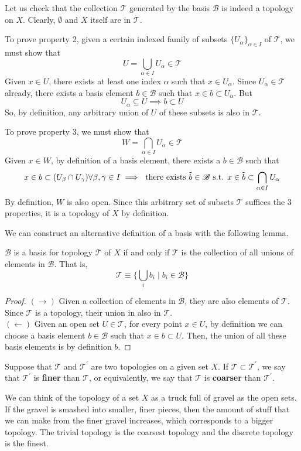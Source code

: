 \documentclass{article}
\begin{document}
    Let us check that the collection $\mathscr{T}$ generated by the basis $\mathscr{B}$ is indeed a topology on $X$. Clearly, $\emptyset$ and $X$ itself are in $\mathscr{T}$. 

    To prove property 2, given a certain indexed family of subsets $\{U_\alpha\}_{\alpha \in I}$ of $\mathscr{T}$, we must show that 
    \[U = \bigcup_{\alpha \in I} U_\alpha \in \mathscr{T}\]
    Given $x \in U$, there exists at least one index $\alpha$ such that $x \in U_\alpha$. Since $U_\alpha \in \mathscr{T}$ already, there exists a basis element $b \in \mathscr{B}$ such that $x \in b \subset U_\alpha$. But 
    \[U_\alpha \subseteq U \implies b \subset U\]
    So, by definition, any arbitrary union of $U$ of these subsets is also in $\mathscr{T}$. 

    To prove property 3, we must show that 
    \[W = \bigcap_{\alpha \in I} U_\alpha \in \mathscr{T}\]
    Given $x \in W$, by definition of a basis element, there exists a $b \in \mathscr{B}$ such that 
    \[x \in b \subset (U_\beta \cap U_\gamma) \forall \beta, \gamma \in I \implies \text{ there exists } \Tilde{b} \in \mathscr{B} \text{ s.t. } x \in \Tilde{b} \subset \bigcap_{\alpha \in I} U_\alpha\]
    By definition, $W$ is also open. Since this arbitrary set of subsets $\mathscr{T}$ suffices the 3 properties, it is a topology of $X$ by definition. 

    We can construct an alternative definition of a basis with the following lemma. 

    \begin{lemma}
    $\mathscr{B}$ is a basis for topology $\mathscr{T}$ of $X$ if and only if $\mathscr{T}$ is the collection of all unions of elements in $\mathscr{B}$. That is, 
    \[\mathscr{T} \equiv \Big\{ \bigcup_i b_i \; \Big| \; b_i \in \mathscr{B}\Big\}\]
    \end{lemma}
    \begin{proof}
    $(\rightarrow)$ Given a collection of elements in $\mathscr{B}$, they are also elements of $\mathscr{T}$. Since $\mathscr{T}$ is a topology, their union in also in $\mathscr{T}$. \\
    $(\leftarrow)$ Given an open set $U \in \mathscr{T}$, for every point $x \in U$, by definition we can choose a basis element $b \in \mathscr{B}$ such that $x \in b \subset U$. Then, the union of all these basis elements is by definition $b$. 
    \end{proof}

    \begin{definition}
    Suppose that $\mathscr{T}$ and $\mathscr{T}^\prime$ are two topologies on a given set $X$. If $\mathscr{T} \subset \mathscr{T}^\prime$, we say that $\mathscr{T}^\prime$ is \textbf{finer} than $\mathscr{T}$, or equivalently, we say that $\mathscr{T}$ is \textbf{coarser} than $\mathscr{T}^\prime$. 
    \end{definition}
    We can think of the topology of a set $X$ as a truck full of gravel as the open sets. If the gravel is smashed into smaller, finer pieces, then the amount of stuff that we can make from the finer gravel increases, which corresponds to a bigger topology. The trivial topology is the coarsest topology and the discrete topology is the finest. 
\end{document}
